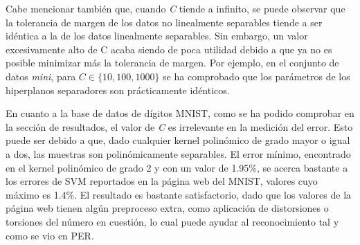\documentclass[a4paper]{article}
\begin{document}
\quad Cabe mencionar también que, cuando \textit{C} tiende a infinito, se puede observar que la tolerancia de margen de los datos no linealmente separables tiende a ser idéntica a la de los datos linealmente separables. Sin embargo, un valor excesivamente alto de C acaba siendo de poca utilidad debido a que ya no es posible minimizar más la tolerancia de margen. Por ejemplo, en el conjunto de datos \textit{mini}, para $C \in \lbrace 10, 100, 1000 \rbrace$  se ha comprobado que los parámetros de los hiperplanos separadores son prácticamente idénticos.

\quad En cuanto a la base de datos de dígitos MNIST, como se ha podido comprobar en la sección de resultados, el valor de \textit{C} es irrelevante en la medición del error. Esto puede ser debido a que, dado cualquier kernel polinómico de grado mayor o igual a dos, las muestras son polinómicamente separables. El error mínimo, encontrado en el kernel polinómico de grado 2 y con un valor de 1.95\%, se acerca bastante a los errores de SVM reportados en la página web del MNIST, valores cuyo máximo es 1.4\%. El resultado es bastante satisfactorio, dado que los valores de la página web tienen algún preproceso extra, como aplicación de distorsiones o torsiones del número en cuestión, lo cual puede ayudar al reconocimiento tal y como se vio en PER.
\end{document}
